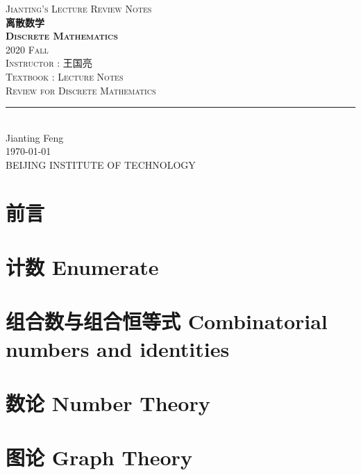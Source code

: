 \documentclass[11pt,titlepage]{book}
\begin{document}
\begin{titlepage}
	\centering
    \textsc{\LARGE Jianting's Lecture Review Notes}\\ \vspace{\fill}
    \textbf{\textsc{\fontsize{20}{20}\selectfont 离散数学\\ Discrete Mathematics}}\\ \vspace{\fill}
    \medskip
    \textsc{2020 Fall}\\
    \medskip
    \textsc{Instructor : 王国亮}\\
    \medskip
    \textsc{Textbook : Lecture Notes}\\
    \bigskip
	\textsc{Review for Discrete Mathematics}\\[0.4cm]
	\rule{\linewidth}{0.2 mm} \\[0.5 cm]
	Jianting Feng\\
	\today\\
	BEIJING INSTITUTE OF TECHNOLOGY
\end{titlepage}
\restoregeometry

\frontmatter 
\chapter{前言}

\newpage
\tableofcontents
\newpage
\thispagestyle{numberonly}
\mainmatter 
\chapter{计数 Enumerate}

\chapter{组合数与组合恒等式 Combinatorial numbers
and identities}

\chapter{数论 Number Theory}


\chapter{图论 Graph Theory}


\clearpage
\pagestyle{numberonly}
\printbibliography
\end{document}
